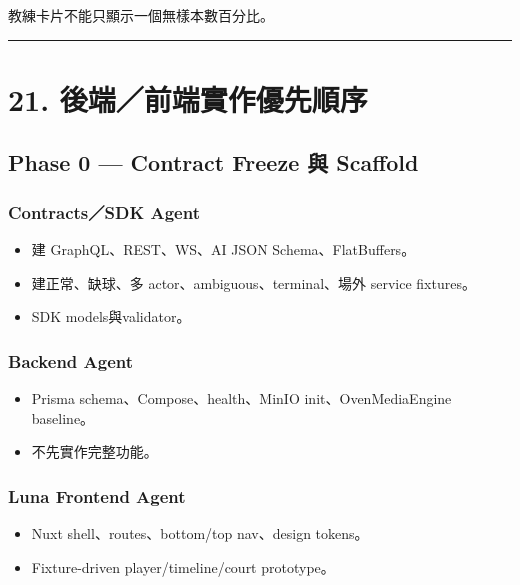 \documentclass[
  9pt,
  a4paper,
]{article}
\providecommand{\tightlist}{%
  \setlength{\itemsep}{0pt}\setlength{\parskip}{0pt}}
\begin{document}
教練卡片不能只顯示一個無樣本數百分比。

\begin{center}\rule{0.5\linewidth}{0.5pt}\end{center}

\section{21.
後端／前端實作優先順序}\label{21-ux5f8cux7aefux524dux7aefux5be6ux4f5cux512aux5148ux9806ux5e8f}

\subsection{Phase 0 --- Contract Freeze 與
Scaffold}\label{phase-0--contract-freeze-ux8207-scaffold}

\subsubsection{Contracts／SDK Agent}\label{contractssdk-agent}

\begin{itemize}
\tightlist
\item
  建 GraphQL、REST、WS、AI JSON Schema、FlatBuffers。
\item
  建正常、缺球、多 actor、ambiguous、terminal、場外 service fixtures。
\item
  SDK models與validator。
\end{itemize}

\subsubsection{Backend Agent}\label{backend-agent}

\begin{itemize}
\tightlist
\item
  Prisma schema、Compose、health、MinIO init、OvenMediaEngine baseline。
\item
  不先實作完整功能。
\end{itemize}

\subsubsection{Luna Frontend Agent}\label{luna-frontend-agent}

\begin{itemize}
\tightlist
\item
  Nuxt shell、routes、bottom/top nav、design tokens。
\item
  Fixture-driven player/timeline/court prototype。
\end{itemize}
\end{document}

